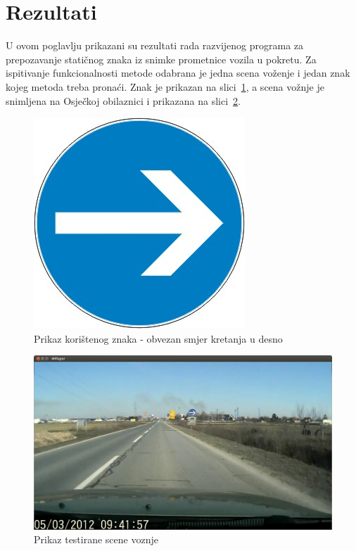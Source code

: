 \newpage
\setcounter{figure}{0}

\section{Rezultati} %
\label{sec:Rezultati}

U ovom poglavlju prikazani su rezultati rada razvijenog programa za
prepozavanje statičnog znaka iz snimke prometnice vozila u pokretu.  Za
ispitivanje funkcionalnosti metode odabrana je jedna scena voženje i
jedan znak kojeg metoda treba pronaći. Znak je prikazan na
slici~\ref{fig:znak}, a scena vožnje je snimljena na Osječkoj
obilaznici i prikazana na slici~\ref{fig:scena.png}.

\begin{figure}[h]
\centering
\includegraphics[scale=0.5]{figures/znak.png}
\caption{Prikaz korištenog znaka - obvezan smjer kretanja u desno}
\label{fig:znak}
\end{figure}

\begin{figure}[h]
\centering
\includegraphics[scale=0.3]{figures/scena.png}
\caption{Prikaz testirane scene voznje}
\label{fig:scena.png}
\end{figure}

